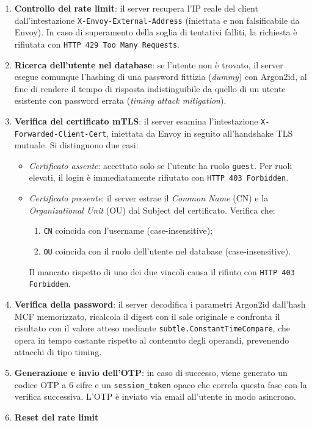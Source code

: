 \begin{enumerate}
  \item \textbf{Controllo del rate limit}: il server recupera l'IP reale
    del client dall'intestazione \texttt{X-Envoy-External-Address}
    (iniettata e non falsificabile da Envoy). In caso di superamento della
    soglia di tentativi falliti, la richiesta è rifiutata con
    \texttt{HTTP 429 Too Many Requests}.

  \item \textbf{Ricerca dell'utente nel database}: se l'utente non è
    trovato, il server esegue comunque l'hashing di una password fittizia
    (\emph{dummy}) con Argon2id, al fine di rendere il tempo di risposta
    indistinguibile da quello di un utente esistente con password errata
    (\emph{timing attack mitigation}).

  \item \textbf{Verifica del certificato mTLS}: il server esamina
    l'intestazione \texttt{X-Forwarded-Client-Cert}, iniettata da Envoy
    in seguito all'handshake TLS mutuale. Si distinguono due casi:
    \begin{itemize}
      \item \emph{Certificato assente}: accettato solo se l'utente ha
        ruolo \texttt{guest}. Per ruoli elevati, il login è immediatamente
        rifiutato con \texttt{HTTP 403 Forbidden}.
      \item \emph{Certificato presente}: il server estrae il
        \emph{Common Name} (CN) e la \emph{Organizational Unit} (OU) dal
        Subject del certificato. Verifica che:
        \begin{enumerate}
          \item \texttt{CN} coincida con l'username (case-insensitive);
          \item \texttt{OU} coincida con il ruolo dell'utente nel database
            (case-insensitive).
        \end{enumerate}
        Il mancato rispetto di uno dei due vincoli causa il rifiuto con
        \texttt{HTTP 403 Forbidden}.
    \end{itemize}

  \item \textbf{Verifica della password}: il server decodifica i parametri
    Argon2id dall'hash MCF memorizzato, ricalcola il digest con il sale
    originale e confronta il risultato con il valore atteso mediante
    \texttt{subtle.ConstantTimeCompare}, che opera in tempo costante
    rispetto al contenuto degli operandi, prevenendo attacchi di tipo
    timing.

  \item \textbf{Generazione e invio dell'OTP}: in caso di successo, viene
    generato un codice OTP a 6 cifre e un \texttt{session\_token} opaco
    che correla questa fase con la verifica successiva. L'OTP è inviato
    via email all'utente in modo asincrono.

  \item \textbf{Reset del rate limit}
\end{enumerate}

